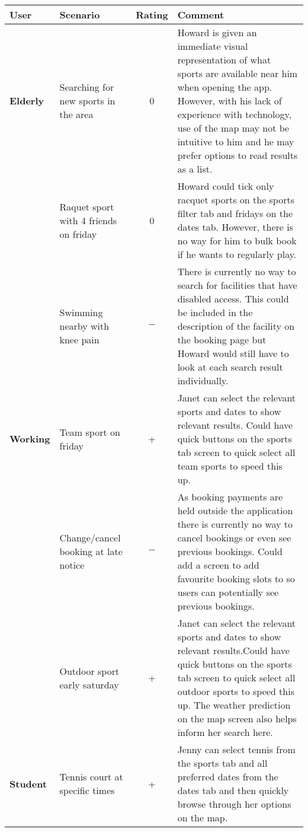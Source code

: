 \begin{center}
	\renewcommand{\arraystretch}{2}
	\begin{longtable}{p{} p{} c p{}}
		\toprule
		\textbf{User} & \textbf{Scenario} & \textbf{Rating} & \textbf{Comment}\\
		\midrule
		\textbf{Elderly} & Searching for new sports in the area & 0 & Howard is
		given an immediate visual representation of what sports are available
		near him when opening the app. However, with his lack of experience
		with technology, use of the map may not be intuitive to him and he may
		prefer options to read results as a list.\\

		& Raquet sport with 4 friends on friday & 0 & Howard could tick only
		racquet sports on the sports filter tab and fridays on the dates tab.
		However, there is no way for him to bulk book if he wants to regularly
		play.\\

		& Swimming nearby with knee pain & $-$ & There is currently no way to
		search for facilities that have disabled access. This could be included
		in the description of the facility on the booking page but Howard would
		still have to look at each search result individually.\\

		\midrule
		\textbf{Working} & Team sport on friday & + & Janet can select the
		relevant sports and dates to show relevant results.  Could have quick
		buttons on the sports tab screen to quick select all team sports to
		speed this up.\\

		& Change/cancel booking at late notice & $-$ & As booking payments are
		held outside the application there is currently no way to cancel
		bookings or even see previous bookings. Could add a screen to add
		favourite booking slots to so users can potentially see previous
		bookings.\\

		& Outdoor sport early saturday & + & Janet can select the relevant
		sports and dates to show relevant results.Could have quick buttons on
		the sports tab screen to quick select all outdoor sports to speed this
		up. The weather prediction on the map screen also helps inform her
		search here.\\

		\midrule
		\textbf{Student} & Tennis court at specific times & + & Jenny can
		select tennis from the sports tab and all preferred dates from the
		dates tab and then quickly browse through her options on the map. \\


\end{longtable}
\end{center}
